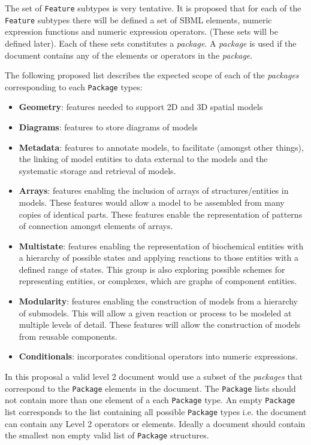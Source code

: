\documentclass{cekarticle}
\begin{document}
The set of \texttt{Feature} subtypes is very tentative.  It is
proposed that for each of the \texttt{Feature} subtypes there
will be defined a set of SBML elements, numeric expression
functions and numeric expression operators. (These sets will be
defined later).  Each of these sets constitutes a
\emph{package}.  A \emph{package} is used if the document
contains any of the elements or operators in the \emph{package}.

The following proposed list describes the expected scope of each of the
\emph{packages} corresponding to each \texttt{Package} types:
\begin{itemize}
\item \textbf{Geometry}: features needed to support 2D and 3D spatial
models
\item \textbf{Diagrams}: features to store diagrams of models
\item \textbf{Metadata}: features to annotate models, to facilitate
(amongst other things), the linking of model entities to data
external to the models and the systematic storage and retrieval
of models.
\item \textbf{Arrays}: features enabling the inclusion of arrays of
structures/entities in models.  These features would allow a model
to be assembled from many copies of identical parts.  These
features enable the representation of patterns of connection
amongst elements of arrays.
\item \textbf{Multistate}: features enabling the representation of
biochemical entities with a hierarchy of possible states and
applying reactions to those entities with a defined range of
states.  This group is also exploring possible schemes for
representing entities, or complexes, which are graphs of
component entities.
\item \textbf{Modularity}: features enabling the construction of models
from a hierarchy of submodels.  This will allow a given reaction
or process to be modeled at multiple levels of detail.  These
features will allow the construction of models from reusable
components.
\item \textbf{Conditionals}: incorporates conditional operators into
numeric expressions.
\end{itemize}

In this proposal a valid level 2 document would use a subset of
the \emph{packages} that correspond to the \texttt{Package}
elements in the document. The \texttt{Package} lists should not
contain more than one element of a each \texttt{Package} type. An
empty \texttt{Package} list corresponds to the list containing
all possible \texttt{Package} types i.e. the document can contain
any Level 2 operators or elements.  Ideally a document should
contain the smallest non empty valid list of \texttt{Package} structures.
\end{document}
